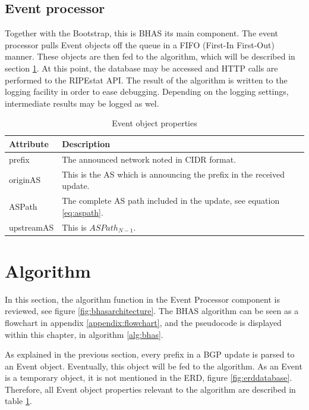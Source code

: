\subsection{Event processor}\label{subsec:bhaseventprocessor}
Together with the Bootstrap, this is BHAS its main component. The event processor pulls Event objects off the queue in a FIFO (First-In First-Out) manner. These objects are then fed to the algorithm, which will be described in section \ref{sec:algorithm}. At this point, the database may be accessed and HTTP calls are performed to the RIPEstat API. The result of the algorithm is written to the logging facility in order to ease debugging. Depending on the logging settings, intermediate results may be logged as wel.
\begin{table}[h]
        \centering
        \begin{tabular}{|p{2cm}|p{12cm}|}\hline
                \textbf{Attribute} & \textbf{Description} \\ \hline
                prefix & The announced network noted in CIDR format. \\ \hline
                originAS & This is the AS which is announcing the prefix in the received update. \\ \hline
                ASPath & The complete AS path included in the update, see equation \ref{eq:aspath}. \\ \hline
                upstreamAS & This is $ASPath_{N-1}$. \\ \hline
        \end{tabular}
        \caption{Event object properties}
        \label{table:bhasevent}
\end{table}

\section{Algorithm}\label{sec:algorithm}
In this section, the algorithm function in the Event Processor component is reviewed, see figure \ref{fig:bhasarchitecture}. The BHAS algorithm can be seen as a flowchart in appendix \ref{appendix:flowchart}, and the pseudocode is displayed within this chapter, in algorithm \ref{alg:bhas}.

As explained in the previous section, every prefix in a BGP update is parsed to an Event object. Eventually, this object will be fed to the algorithm. As an Event is a temporary object, it is not mentioned in the ERD, figure \ref{fig:erddatabase}. Therefore, all Event object properties relevant to the algorithm are described in table \ref{table:bhasevent}.

